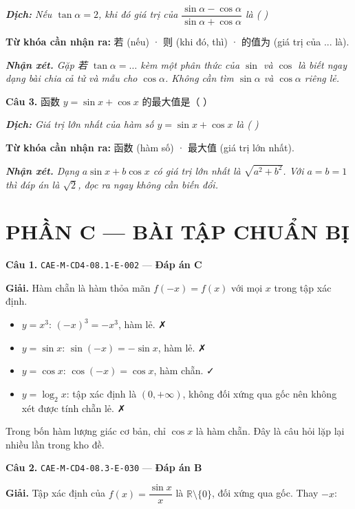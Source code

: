 \documentclass[11pt, a4paper]{article}
\begin{document}
\noindent\emph{\textbf{Dịch:} Nếu $\tan\alpha = 2$, khi đó giá trị của $\dfrac{\sin\alpha - \cos\alpha}{\sin\alpha + \cos\alpha}$ là ( )}

\textbf{Từ khóa cần nhận ra:} 若 (nếu) · 则 (khi đó, thì) · 的值为 (giá trị của ... là).

\noindent\emph{\textbf{Nhận xét.} Gặp 若 $\tan\alpha = \ldots$ kèm một phân thức của $\sin$ và $\cos$ là biết ngay dạng bài chia cả tử và mẫu cho $\cos\alpha$. Không cần tìm $\sin\alpha$ và $\cos\alpha$ riêng lẻ.}

\textbf{Câu 3.} 函数 $y = \sin x + \cos x$ 的最大值是（ ）

\noindent\emph{\textbf{Dịch:} Giá trị lớn nhất của hàm số $y = \sin x + \cos x$ là ( )}

\textbf{Từ khóa cần nhận ra:} 函数 (hàm số) · 最大值 (giá trị lớn nhất).

\noindent\emph{\textbf{Nhận xét.} Dạng $a\sin x + b\cos x$ có giá trị lớn nhất là $\sqrt{a^2+b^2}$. Với $a = b = 1$ thì đáp án là $\sqrt{2}$, đọc ra ngay không cần biến đổi.}

\section{PHẦN C — BÀI TẬP CHUẨN BỊ}

\textbf{Câu 1.} \texttt{CAE-M-CD4-08.1-E-002} — \textbf{Đáp án C}

\textbf{Giải.} Hàm chẵn là hàm thỏa mãn $f(-x) = f(x)$ với mọi $x$ trong tập xác định.

\begin{itemize}[leftmargin=1.4em, itemsep=2pt]
\item $y = x^3$: $(-x)^3 = -x^3$, hàm lẻ. ✗
\item $y = \sin x$: $\sin(-x) = -\sin x$, hàm lẻ. ✗
\item $y = \cos x$: $\cos(-x) = \cos x$, hàm chẵn. ✓
\item $y = \log_2 x$: tập xác định là $(0, +\infty)$, không đối xứng qua gốc nên không xét được tính chẵn lẻ. ✗
\end{itemize}

 Trong bốn hàm lượng giác cơ bản, chỉ $\cos x$ là hàm chẵn. Đây là câu hỏi lặp lại nhiều lần trong kho đề.

\textbf{Câu 2.} \texttt{CAE-M-CD4-08.3-E-030} — \textbf{Đáp án B}

\textbf{Giải.} Tập xác định của $f(x) = \dfrac{\sin x}{x}$ là $\mathbb{R} \setminus \{0\}$, đối xứng qua gốc. Thay $-x$:
\end{document}
